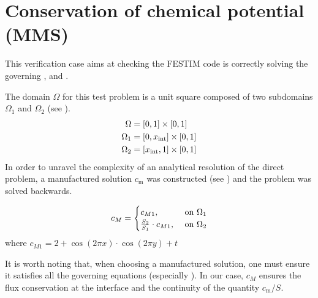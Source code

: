 \section{Conservation of chemical potential (MMS)}

This verification case aims at checking the FESTIM code is correctly solving the governing ,  and .

The domain $\Omega$ for this test problem is a unit square composed of two subdomains $\Omega_1$ and $\Omega_2$ (see ).
\begin{subequations} \labeq{MMS domain}
\begin{align}
    \Omega &= [0, 1] \times [0, 1] \\
    \Omega_1 &= [0, x_\mathrm{int}] \times [0, 1] \\
    \Omega_2 &= [x_\mathrm{int}, 1] \times [0, 1] \\
\end{align}
\end{subequations}
In order to unravel the complexity of an analytical resolution of the direct problem, a manufactured solution $c_\mathrm{m}$ was constructed (see ) and the problem was solved backwards.

\begin{equation}
        c_M= 
\begin{cases}
    c_{M1},& \text{ on } \Omega_1\\
    \frac{S_2}{S_1} \cdot c_{M1},& \text{ on } \Omega_2
\end{cases}
\labeq{manufactured solution}
\end{equation}
where $c_{M1} = 2 + \cos(2\pi x) \cdot \cos(2\pi y) + t$

It is worth noting that, when choosing a manufactured solution, one must ensure it satisfies all the governing equations (especially ).
In our case, $c_M$ ensures the flux conservation at the interface and the continuity of the quantity $c_\mathrm{m}/S$.

